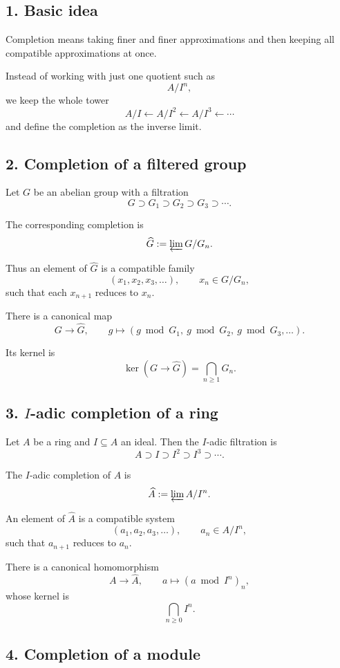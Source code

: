 \documentclass[12pt,a4paper]{article}
\theoremstyle{plain}
\theoremstyle{definition}      %
\begin{document}
	\subsection*{1. Basic idea}
	
	Completion means taking finer and finer approximations and then keeping all compatible approximations at once.
	
	Instead of working with just one quotient such as
	\[
	A/I^n,
	\]
	we keep the whole tower
	\[
	A/I \xleftarrow{} A/I^2 \xleftarrow{} A/I^3 \xleftarrow{}\cdots
	\]
	and define the completion as the inverse limit.
	
	\subsection*{2. Completion of a filtered group}
	
	Let \(G\) be an abelian group with a filtration
	\[
	G \supset G_1 \supset G_2 \supset G_3 \supset \cdots.
	\]
	
	The corresponding completion is
	\[
	\widehat G := \varprojlim G/G_n.
	\]
	
	Thus an element of \(\widehat G\) is a compatible family
	\[
	(x_1,x_2,x_3,\dots),
	\qquad
	x_n\in G/G_n,
	\]
	such that each \(x_{n+1}\) reduces to \(x_n\).
	
	There is a canonical map
	\[
	G\to \widehat G,
	\qquad
	g\mapsto (g \bmod G_1,\ g\bmod G_2,\ g\bmod G_3,\dots).
	\]
	
	Its kernel is
	\[
	\ker(G\to \widehat G)=\bigcap_{n\ge1} G_n.
	\]
	
	\subsection*{3. \(I\)-adic completion of a ring}
	
	Let \(A\) be a ring and \(I\subseteq A\) an ideal. Then the \(I\)-adic filtration is
	\[
	A \supset I \supset I^2 \supset I^3 \supset \cdots.
	\]
	
	The \(I\)-adic completion of \(A\) is
	\[
	\widehat A := \varprojlim A/I^n.
	\]
	
	An element of \(\widehat A\) is a compatible system
	\[
	(a_1,a_2,a_3,\dots),
	\qquad
	a_n\in A/I^n,
	\]
	such that \(a_{n+1}\) reduces to \(a_n\).
	
	There is a canonical homomorphism
	\[
	A\to \widehat A,
	\qquad
	a\mapsto (a\bmod I^n)_n,
	\]
	whose kernel is
	\[
	\bigcap_{n\ge0} I^n.
	\]
	
	\subsection*{4. Completion of a module}
	
\end{document}
